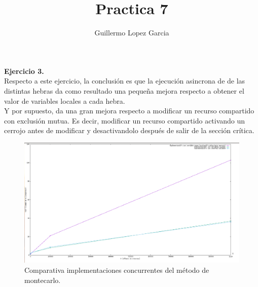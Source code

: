 \documentclass[]{article}
\title{Practica 7}
\author{Guillermo Lopez Garcia}
\begin{document}
\maketitle

\textbf{Ejercicio 3.} \\

Respecto a este ejercicio, la conclusión es que la ejecución asincrona de
de las distintas hebras da como resultado una pequeña mejora respecto
a obtener el valor de variables locales a cada hebra.\\

Y por supuesto, da una gran mejora respecto a modificar un recurso compartido
con exclusión mutua. Es decir, modificar un recurso compartido activando
un cerrojo antes de modificar y desactivandolo después de salir de la sección
crítica. \\

\begin{figure}
\includegraphics[width=\linewidth]{img.png}
\caption{Comparativa implementaciones concurrentes del método de montecarlo.}
\label{fig:comp}
\end{figure}
\end{document}
